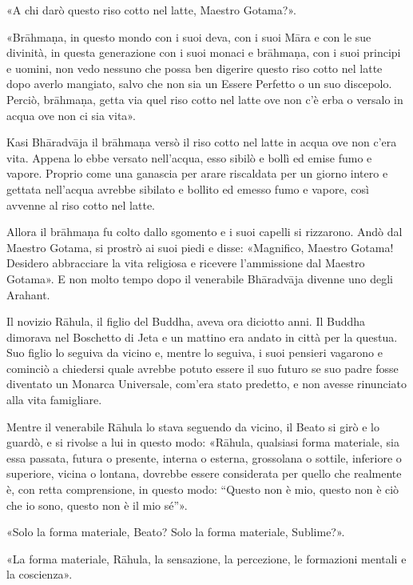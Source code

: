 «A chi darò questo riso cotto nel latte, Maestro Gotama?».


«Brāhmaṇa, in questo mondo con i suoi deva, con i suoi Māra e con le sue
divinità, in questa generazione con i suoi monaci e brāhmaṇa, con i suoi
principi e uomini, non vedo nessuno che possa ben digerire questo riso
cotto nel latte dopo averlo mangiato, salvo che non sia un Essere
Perfetto o un suo discepolo. Perciò, brāhmaṇa, getta via quel riso cotto
nel latte ove non c’è erba o versalo in acqua ove non ci sia vita».


Kasi Bhāradvāja il brāhmaṇa versò il riso cotto nel latte in acqua ove
non c’era vita. Appena lo ebbe versato nell’acqua, esso sibilò e bollì
ed emise fumo e vapore. Proprio come una ganascia per arare riscaldata
per un giorno intero e gettata nell’acqua avrebbe sibilato e bollito ed
emesso fumo e vapore, così avvenne al riso cotto nel latte.


Allora il brāhmaṇa fu colto dallo sgomento e i suoi capelli si
rizzarono. Andò dal Maestro Gotama, si prostrò ai suoi piedi e disse:
«Magnifico, Maestro Gotama! Desidero abbracciare la vita religiosa e
ricevere l’ammissione dal Maestro Gotama». E non molto tempo dopo il
venerabile Bhāradvāja divenne uno degli Arahant.




 Il novizio Rāhula, il figlio del Buddha, aveva ora
diciotto anni. Il Buddha dimorava nel Boschetto di Jeta e un mattino era
andato in città per la questua. Suo figlio lo seguiva da vicino e,
mentre lo seguiva, i suoi pensieri vagarono e cominciò a chiedersi quale
avrebbe potuto essere il suo futuro se suo padre fosse diventato un
Monarca Universale, com’era stato predetto, e non avesse rinunciato alla
vita famigliare.


 Mentre il venerabile Rāhula lo stava seguendo da vicino, il
Beato si girò e lo guardò, e si rivolse a lui in questo modo: «Rāhula,
qualsiasi forma materiale, sia essa passata, futura o presente, interna
o esterna, grossolana o sottile, inferiore o superiore, vicina o
lontana, dovrebbe essere considerata per quello che realmente è, con
retta comprensione, in questo modo: “Questo non è mio, questo non è ciò
che io sono, questo non è il mio sé”».


«Solo la forma materiale, Beato? Solo la forma materiale, Sublime?».


«La forma materiale, Rāhula, la sensazione, la percezione, le formazioni
mentali e la coscienza».


